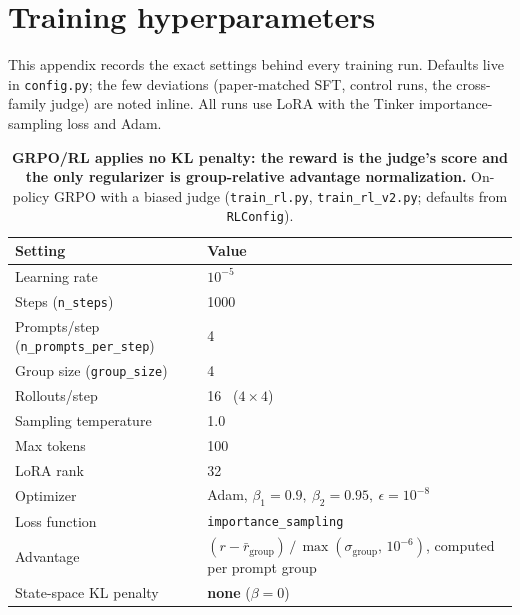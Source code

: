 
\section{Training hyperparameters}
\label{app:hyperparams}

This appendix records the exact settings behind every training run. Defaults live
in \texttt{config.py}; the few deviations (paper-matched SFT, control runs, the
cross-family judge) are noted inline. All runs use LoRA with the Tinker
importance-sampling loss and Adam.

\begin{table}[h]
\centering
\caption{\textbf{GRPO/RL applies no KL penalty: the reward is the judge's score and
the only regularizer is group-relative advantage normalization.} On-policy GRPO with
a biased judge (\texttt{train\_rl.py}, \texttt{train\_rl\_v2.py}; defaults from
\texttt{RLConfig}).}
\begin{tabularx}{\linewidth}{@{}lX@{}}
\toprule
Setting & Value \\
\midrule
Learning rate & $10^{-5}$ \\
\addlinespace
Steps (\texttt{n\_steps}) & 1000 \\
\addlinespace
Prompts/step (\texttt{n\_prompts\_per\_step}) & 4 \\
\addlinespace
Group size (\texttt{group\_size}) & 4 \\
\addlinespace
Rollouts/step & 16 \ ($4\times4$) \\
\addlinespace
Sampling temperature & 1.0 \\
\addlinespace
Max tokens & 100 \\
\addlinespace
LoRA rank & 32 \\
\addlinespace
Optimizer & Adam, $\beta_1{=}0.9,\ \beta_2{=}0.95,\ \epsilon{=}10^{-8}$ \\
\addlinespace
Loss function & \texttt{importance\_sampling} \\
\addlinespace
Advantage & $(r-\bar r_{\text{group}})\,/\,\max(\sigma_{\text{group}},\,10^{-6})$,
  computed per prompt group \\
\addlinespace
State-space KL penalty & \textbf{none} ($\beta=0$) \\
\bottomrule
\end{tabularx}
\end{table}

